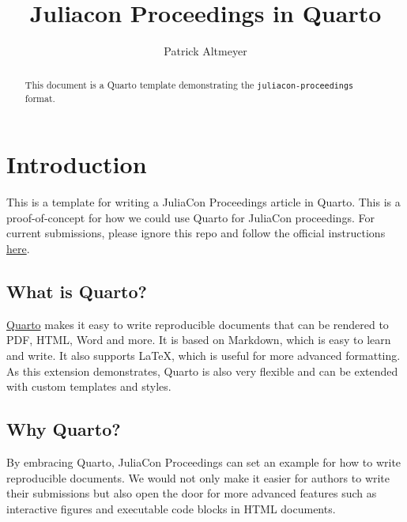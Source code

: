 \documentclass{juliacon}
\title{Juliacon Proceedings in Quarto}
\author[1]{Patrick Altmeyer}
\affil[1]{Delft University of Technology}
\date{}
\begin{document}
\maketitle

\begin{abstract}
This document is a Quarto template demonstrating the
\texttt{juliacon-proceedings} format.
\end{abstract}



\setcounter{page}{1}

\section{Introduction}\label{sec-intro}

This is a template for writing a JuliaCon Proceedings article in Quarto.
This is a proof-of-concept for how we could use Quarto for JuliaCon
proceedings. For current submissions, please ignore this repo and follow
the official instructions
\href{https://github.com/JuliaCon/JuliaConSubmission.jl}{here}.

\subsection{What is Quarto?}\label{what-is-quarto}

\href{https://quarto.org/}{Quarto} makes it easy to write reproducible
documents that can be rendered to PDF, HTML, Word and more. It is based
on Markdown, which is easy to learn and write. It also supports LaTeX,
which is useful for more advanced formatting. As this extension
demonstrates, Quarto is also very flexible and can be extended with
custom templates and styles.

\subsection{Why Quarto?}\label{why-quarto}

By embracing Quarto, JuliaCon Proceedings can set an example for how to
write reproducible documents. We would not only make it easier for
authors to write their submissions but also open the door for more
advanced features such as interactive figures and executable code blocks
in HTML documents.
\end{document}
